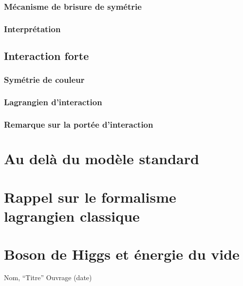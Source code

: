 \documentclass{article}
\begin{document}
				\subsubsection{Mécanisme de brisure de symétrie} 
				\subsubsection{Interprétation}
			\subsection{Interaction forte}
				\subsubsection{Symétrie de couleur}
				\subsubsection{Lagrangien d'interaction}
				\subsubsection{Remarque sur la portée d'interaction}
		
		
		
		\section{Au delà du modèle standard}
		
		
		\begin{appendices}
			\section{Rappel sur le formalisme lagrangien classique}

			\section{Boson de Higgs et énergie du vide}
		\end{appendices}
		
		\begin{thebibliography}{4}
			Nom,
			``Titre''
			Ouvrage (date) 
			

			\end{thebibliography}
	
\end{document}
